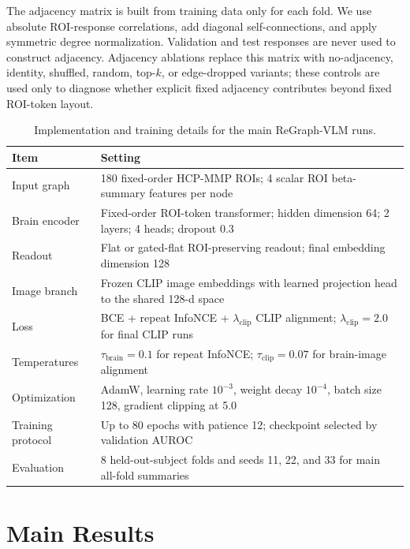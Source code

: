 \documentclass{article}
\begin{document}
The adjacency matrix is built from training data only for each fold. We use absolute ROI-response correlations, add diagonal self-connections, and apply symmetric degree normalization. Validation and test responses are never used to construct adjacency. Adjacency ablations replace this matrix with no-adjacency, identity, shuffled, random, top-$k$, or edge-dropped variants; these controls are used only to diagnose whether explicit fixed adjacency contributes beyond fixed ROI-token layout.

\begin{table}[!htbp]
  \centering
  \caption{Implementation and training details for the main ReGraph-VLM runs.}
  \label{tab:implementation_details}
  \scriptsize
  \setlength{\tabcolsep}{5pt}
  \renewcommand{\arraystretch}{1.15}
  \begin{tabularx}{\linewidth}{lX}
    \toprule
    Item & Setting \\
    \midrule
    Input graph & 180 fixed-order HCP-MMP ROIs; 4 scalar ROI beta-summary features per node \\
    Brain encoder & Fixed-order ROI-token transformer; hidden dimension 64; 2 layers; 4 heads; dropout 0.3 \\
    Readout & Flat or gated-flat ROI-preserving readout; final embedding dimension 128 \\
    Image branch & Frozen CLIP image embeddings with learned projection head to the shared 128-d space \\
    Loss & BCE + repeat InfoNCE + $\lambda_{\mathrm{clip}}$ CLIP alignment; $\lambda_{\mathrm{clip}}=2.0$ for final CLIP runs \\
    Temperatures & $\tau_{\mathrm{brain}}=0.1$ for repeat InfoNCE; $\tau_{\mathrm{clip}}=0.07$ for brain-image alignment \\
    Optimization & AdamW, learning rate $10^{-3}$, weight decay $10^{-4}$, batch size 128, gradient clipping at 5.0 \\
    Training protocol & Up to 80 epochs with patience 12; checkpoint selected by validation AUROC \\
    Evaluation & 8 held-out-subject folds and seeds 11, 22, and 33 for main all-fold summaries \\
    \bottomrule
  \end{tabularx}
\end{table}

\section{Main Results}
\end{document}
